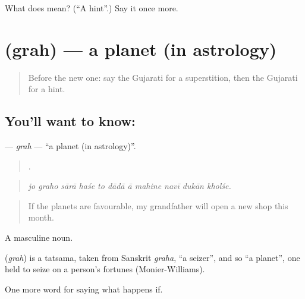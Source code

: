 \begin{tcolorbox}[breakable,colback=teal!4,colframe=teal!35!black,title={Before you move on}]
What does  mean? (\textquotedblleft{}A hint\textquotedblright{}.) Say it once more.
\end{tcolorbox}
\section[\texorpdfstring{\gu{ગ્રહ} (grah)}{ગ્રહ (grah)}]{ (grah) — a planet (in astrology)}

\label{lesson:GU-C535-grah}



\begin{quote}
Before the new one: say the Gujarati for a superstition, then the Gujarati for a hint.
\end{quote}

\subsection*{You'll want to know: }
\textbf{} — \emph{grah} — \textquotedblleft{}a planet (in astrology)\textquotedblright{}.

\begin{quote}
          .
\end{quote}

\begin{quote}
\emph{jo graho sārā haśe to dādā ā mahine navī dukān kholśe.}
\end{quote}

\begin{quote}
If the planets are favourable, my grandfather will open a new shop this month.
\end{quote}

A masculine noun.

\begin{cousinweb}
\textbf{} (\emph{grah}) is a tatsama, taken from Sanskrit \emph{graha}, \textquotedblleft{}a seizer\textquotedblright{}, and so \textquotedblleft{}a planet\textquotedblright{}, one held to seize on a person's fortunes (Monier-Williams).
\end{cousinweb}

\begin{grammarlens}[title={What you've built}]
One more word for saying what happens if.
\end{grammarlens}

